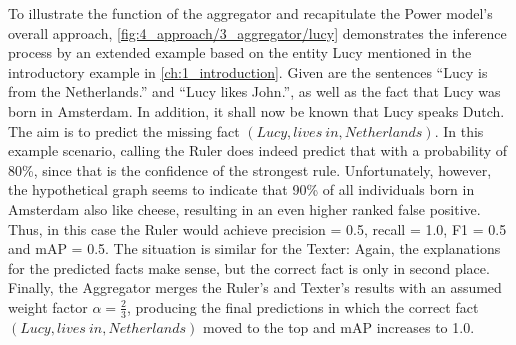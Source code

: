 To illustrate the function of the aggregator and recapitulate the Power model's overall approach, \autoref{fig:4_approach/3_aggregator/lucy} demonstrates the inference process by an extended example based on the entity Lucy mentioned in the introductory example in \autoref{ch:1_introduction}. Given are the sentences ``Lucy is from the Netherlands.'' and ``Lucy likes John.'', as well as the fact that Lucy was born in Amsterdam. In addition, it shall now be known that Lucy speaks Dutch. The aim is to predict the missing fact $(Lucy, lives~in, Netherlands)$. In this example scenario, calling the Ruler does indeed predict that with a probability of 80\%, since that is the confidence of the strongest rule. Unfortunately, however, the hypothetical graph seems to indicate that 90\% of all individuals born in Amsterdam also like cheese, resulting in an even higher ranked false positive. Thus, in this case the Ruler would achieve precision = 0.5, recall = 1.0, F1 = 0.5 and mAP = 0.5. The situation is similar for the Texter: Again, the explanations for the predicted facts make sense, but the correct fact is only in second place. Finally, the Aggregator merges the Ruler's and Texter's results with an assumed weight factor $\alpha = \frac{2}{3}$, producing the final predictions in which the correct fact $(Lucy, lives~in, Netherlands)$ moved to the top and mAP increases to 1.0.
